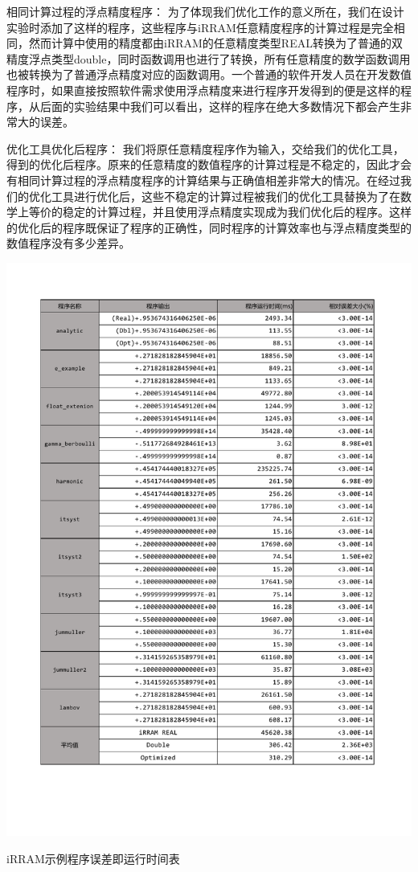 {\kaishu 相同计算过程的浮点精度程序：} 
为了体现我们优化工作的意义所在，我们在设计实验时添加了这样的程序，这些程序与iRRAM任意精度程序的计算过程是完全相同，然而计算中使用的精度都由iRRAM的任意精度类型REAL转换为了普通的双精度浮点类型double，同时函数调用也进行了转换，所有任意精度的数学函数调用也被转换为了普通浮点精度对应的函数调用。一个普通的软件开发人员在开发数值程序时，如果直接按照软件需求使用浮点精度来进行程序开发得到的便是这样的程序，从后面的实验结果中我们可以看出，这样的程序在绝大多数情况下都会产生非常大的误差。 

{\kaishu 优化工具优化后程序：} 
我们将原任意精度程序作为输入，交给我们的优化工具，得到的优化后程序。原来的任意精度的数值程序的计算过程是不稳定的，因此才会有相同计算过程的浮点精度程序的计算结果与正确值相差非常大的情况。在经过我们的优化工具进行优化后，这些不稳定的计算过程被我们的优化工具替换为了在数学上等价的稳定的计算过程，并且使用浮点精度实现成为我们优化后的程序。这样的优化后的程序既保证了程序的正确性，同时程序的计算效率也与浮点精度类型的数值程序没有多少差异。

\begin{table}[thbp]
   \centering
   \includegraphics[width=\columnwidth]{fig/EvalTable_ErrorTime.pdf}
   \caption{iRRAM示例程序误差即运行时间表} \label{fig:error_time}
\end{table}

